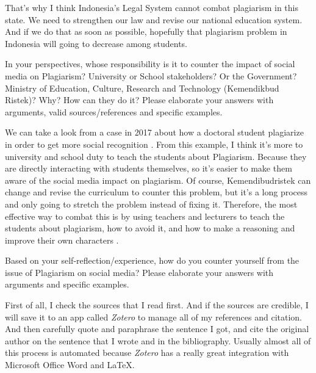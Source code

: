 \documentclass[
  12pt,
  answers  
]{exam}
\begin{document}
\begin{questions}
\begin{solution}
        That's why I think Indonesia's Legal System cannot combat plagiarism in this state. We need to strengthen our law and revise our national education system. And if we do that as soon as possible, hopefully that plagiarism problem in Indonesia will going to decrease among students.
    \end{solution}

    \question
    In your perspectives, whose responsibility is it to counter the impact of social media on Plagiarism? University or School stakeholders? Or the Government? Ministry of Education, Culture, Research and Technology (Kemendikbud Ristek)? Why? How can they do it? Please elaborate your answers with arguments, valid sources/references and specific examples.

    \begin{solution}
        We can take a look from a case in 2017 about how a doctoral student plagiarize in order to get more social recognition \cite{bbcnewsindonesiaDugaanPlagiarismeDi2017}. From this example, I think it's more to university and school duty to teach the students about Plagiarism. Because they are directly interacting with students themselves, so it's easier to make them aware of the social media impact on plagiarism. Of course, Kemendibudristek can change and revise the curriculum to counter this problem, but it's a long process and only going to stretch the problem instead of fixing it. Therefore, the most effective way to combat this is by using teachers and lecturers to teach the students about plagiarism, how to avoid it, and how to make a reasoning and improve their own characters \cite{hasanFenomenaPlagiarismeMahasiswa2016}. 
    \end{solution}

    \question
    Based on your self-reflection/experience, how do you counter yourself from the issue of Plagiarism on social media? Please elaborate your answers with arguments and specific examples.

    \begin{solution}
        First of all, I check the sources that I read first. And if the sources are credible, I will save it to an app called \emph{Zotero} to manage all of my references and citation. And then carefully quote and paraphrase the sentence I got, and cite the original author on the sentence that I wrote and in the bibliography. Usually almost all of this process is automated because \emph{Zotero} has a really great integration with Microsoft Office Word and \LaTeX.
    \end{solution}


\end{questions}
\end{document}
